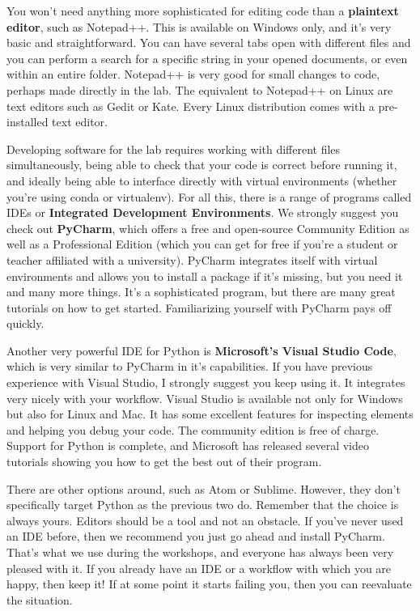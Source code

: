 You won't need anything more sophisticated for editing code than a \textbf{plaintext editor}, such as Notepad++. This is available on Windows only, and it's very basic and straightforward. You can have several tabs open with different files and you can perform a search for a specific string in your opened documents, or even within an entire folder. Notepad++ is very good for small changes to code, perhaps made directly in the lab. The equivalent to Notepad++ on Linux are text editors such as Gedit or Kate. Every Linux distribution comes with a pre-installed text editor.

Developing software for the lab requires working with different files simultaneously, being able to check that your code is correct before running it, and ideally being able to interface directly with virtual environments (whether you're using conda or virtualenv). For all this, there is a range of programs called IDEs or \textbf{Integrated Development Environments}. We strongly suggest you check out \textbf{PyCharm}, which offers a free and open-source Community Edition as well as a Professional Edition (which you can get for free if you're a student or teacher affiliated with a university). PyCharm integrates itself with virtual environments and allows you to install a package if it's missing, but you need it and many more things. It's a sophisticated program, but there are many great tutorials on how to get started. Familiarizing yourself with PyCharm pays off quickly.

Another very powerful IDE for Python is \textbf{Microsoft's Visual Studio Code}, which is very similar to PyCharm in it's capabilities. If you have previous experience with Visual Studio, I strongly suggest you keep using it. It integrates very nicely with your workflow. Visual Studio is available not only for Windows but also for Linux and Mac. It has some excellent features for inspecting elements and helping you debug your code. The community edition is free of charge. Support for Python is complete, and Microsoft has released several video tutorials showing you how to get the best out of their program.

There are other options around, such as Atom or Sublime. However, they don't specifically target Python as the previous two do. Remember that the choice is always yours. Editors should be a tool and not an obstacle. If you've never used an IDE before, then we recommend you just go ahead and install PyCharm. That's what we use during the workshops, and everyone has always been very pleased with it. If you already have an IDE or a workflow with which you are happy, then keep it! If at some point it starts failing you, then you can reevaluate the situation.

